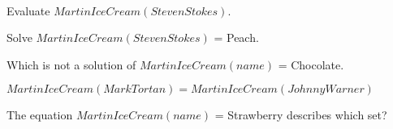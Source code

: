 \documentclass{ximera}
\begin{document}
\quad \\


\begin{question}
Evaluate $MartinIceCream(Steven Stokes)$.
\begin{multipleChoice}
\end{multipleChoice}
\end{question}


\begin{question}
Solve $MartinIceCream(Steven Stokes)$ = Peach.
\begin{multipleChoice}
\end{multipleChoice}
\end{question}



\begin{question}
Which is not a solution of $MartinIceCream(name)$ = Chocolate.
\begin{multipleChoice}
\end{multipleChoice}
\end{question}



\begin{question}
$MartinIceCream(MarkTortan) = MartinIceCream(Johnny Warner)$
\begin{multipleChoice}
\end{multipleChoice}
\end{question}




\begin{question}
The equation $MartinIceCream(name)$ = Strawberry describes which set?
\begin{multipleChoice}
\end{multipleChoice}
\end{question}
\end{document}
